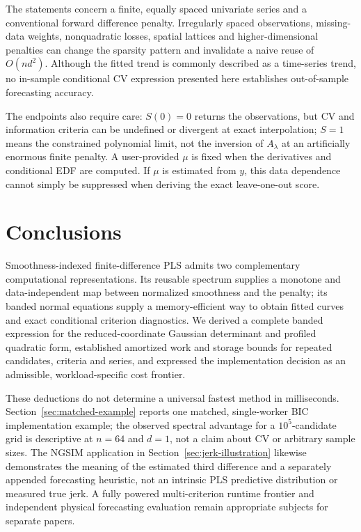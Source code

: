 The statements concern a finite, equally spaced
univariate series and a conventional forward
difference penalty. Irregularly spaced
observations, missing-data weights, nonquadratic
losses, spatial lattices and higher-dimensional
penalties can change the sparsity pattern
and invalidate a naive reuse of $O(nd^2)$.
Although the fitted trend is commonly described
as a time-series trend, no in-sample conditional
CV expression presented here establishes
out-of-sample forecasting accuracy.

The endpoints also require care:
$S(0)=0$ returns the observations, but
$\mathrm{CV}$ and information criteria can be
undefined or divergent at exact interpolation;
$S=1$ means the constrained polynomial limit,
not the inversion of $A_\lambda$ at an
artificially enormous finite penalty.
A user-provided $\mu$ is fixed when the
derivatives and conditional EDF are computed.
If $\mu$ is estimated from $y$, this
data dependence cannot simply be suppressed
when deriving the exact leave-one-out score.

\section{Conclusions}\label{sec:theory_conclusions}
Smoothness-indexed finite-difference PLS
admits two complementary computational
representations. Its reusable spectrum
supplies a monotone and data-independent
map between normalized smoothness and
the penalty; its banded normal equations
supply a memory-efficient way to obtain
fitted curves and exact conditional
criterion diagnostics. We derived a
complete banded expression for the
reduced-coordinate Gaussian determinant
and profiled quadratic form, established
amortized work and storage bounds for
repeated candidates, criteria and series,
and expressed the implementation decision
as an admissible, workload-specific
cost frontier.

These deductions do not determine a universal fastest method
in milliseconds. Section~\ref{sec:matched-example} reports
one matched, single-worker BIC implementation example;
the observed spectral advantage for a $10^5$-candidate grid
is descriptive at $n=64$ and $d=1$, not a claim about CV
or arbitrary sample sizes. The NGSIM application
in Section~\ref{sec:jerk-illustration} likewise demonstrates
the meaning of the estimated third difference and a
separately appended forecasting heuristic, not an
intrinsic PLS predictive distribution or measured true jerk.
A fully powered multi-criterion runtime frontier and
independent physical forecasting evaluation remain
appropriate subjects for separate papers.

